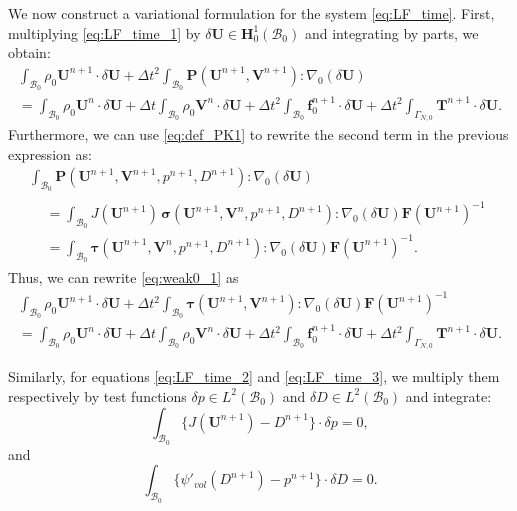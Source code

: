 \documentclass{sfuthesis}
\numberwithin{equation}{section}
\numberwithin{figure}{chapter}
\numberwithin{table}{chapter}
\theoremstyle{definition}
\def\*#1{{\mathbf{#1}}} %
\newcommand{\B}{\mathcal{B}}
\def\bsigma{{\bm{\sigma}}}
\def\btau{{\bm{\tau}}}
\begin{document}
We now construct a variational formulation for the system \eqref{eq:LF_time}. First, multiplying \eqref{eq:LF_time_1} by $\delta \*U \in \*H^1_0(\B_0)$ and integrating by parts, we obtain:
\begin{multline} \label{eq:weak0_1}
    \int_{\B_0} \rho_0 \*U^{n+1} \cdot \delta \*U + \Delta t^2 \int_{\B_0} \*P(\*U^{n+1},\*V^{n+1}) : \nabla_0(\delta \*U)  \\
    = \int_{\B_0} \rho_0 \*U^n \cdot \delta\*U + \Delta t \int_{\B_0} \rho_0 \*V^n \cdot \delta\*U + \Delta t^2 \int_{\B_0} \*f_0^{n+1} \cdot \delta\*U + \Delta t^2 \int_{\Gamma_{N,0}} \*T^{n+1} \cdot \delta \*U.
\end{multline}
Furthermore, we can use \eqref{eq:def_PK1} to rewrite the second term in the previous expression as:
\begin{multline*}
    \int_{\B_0} \*P(\*U^{n+1},\*V^{n+1}, p^{n+1}, D^{n+1}) : \nabla_0(\delta \*U) \\
    \begin{aligned}
        &= \int_{\B_0}  J(\*U^{n+1}) \, \bsigma(\*U^{n+1},\*V^n, p^{n+1}, D^{n+1}) : \nabla_0(\delta\*U) \*F(\*U^{n+1})^{-1} \\
        &= \int_{\B_0}  \btau(\*U^{n+1},\*V^n, p^{n+1}, D^{n+1}) : \nabla_0(\delta\*U) \*F(\*U^{n+1})^{-1}.
    \end{aligned}
\end{multline*}
Thus, we can rewrite \eqref{eq:weak0_1} as
\begin{multline} \label{eq:weak0_2}
\int_{\B_0} \rho_0 \*U^{n+1} \cdot \delta \*U + \Delta t^2 \int_{\B_0} \btau(\*U^{n+1},\*V^{n+1}) : \nabla_0(\delta\*U) \*F(\*U^{n+1})^{-1}  \\
= \int_{\B_0} \rho_0 \*U^n \cdot \delta\*U + \Delta t \int_{\B_0} \rho_0 \*V^n \cdot \delta\*U + \Delta t^2 \int_{\B_0} \*f_0^{n+1} \cdot \delta\*U + \Delta t^2 \int_{\Gamma_{N,0}} \*T^{n+1} \cdot \delta \*U. 
\end{multline}

Similarly, for equations \eqref{eq:LF_time_2} and \eqref{eq:LF_time_3}, we multiply them respectively by test functions $\delta p \in L^2(\B_0)$ and $\delta D \in L^2(\B_0)$ and integrate:
\begin{equation} \label{eq:weak_3}
    \int_{\B_0} \Big\{  J(\*U^{n+1}) - D^{n+1}  \Big\} \cdot \delta p = 0,
    \end{equation}
and
\begin{equation} \label{eq:weak_4}
    \int_{\B_0} \Big\{ \psi'_{vol}(D^{n+1}) - p^{n+1} \Big\} \cdot \delta D = 0.
\end{equation}
\end{document}
